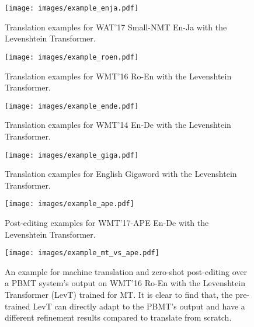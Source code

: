 \documentclass{article}
\begin{document}
\begin{figure}[htpb]
    \centering
    \texttt{[image: images/example\_enja.pdf]}
    \caption{Translation examples for WAT'17 Small-NMT En-Ja with the Levenshtein Transformer.}
    \label{fig:example-enja}
\end{figure}
\begin{figure}[htpb]
    \centering
    \texttt{[image: images/example\_roen.pdf]}
    \caption{Translation examples for WMT'16 Ro-En with the Levenshtein Transformer.}
    \label{fig:example-roen}
\end{figure}
\begin{figure}[htpb]
    \centering
    \texttt{[image: images/example\_ende.pdf]}
    \caption{Translation examples for WMT'14 En-De with the Levenshtein Transformer.}
    \label{fig:example-ende}
\end{figure}
\begin{figure}[htpb]
    \centering
    \texttt{[image: images/example\_giga.pdf]}
    \caption{Translation examples for English Gigaword with the Levenshtein Transformer.}
    \label{fig:example-giga}
\end{figure}
\begin{figure}[htpb]
    \centering
    \texttt{[image: images/example\_ape.pdf]}
    \caption{Post-editing examples for WMT'17-APE En-De with the Levenshtein Transformer.}
    \label{fig:example-ape}
\end{figure}
\begin{figure}[htpb]
    \centering
    \texttt{[image: images/example\_mt\_vs\_ape.pdf]}
    \caption{An example for machine translation and zero-shot post-editing over a PBMT system's output on WMT'16 Ro-En with the Levenshtein Transformer (LevT) trained for MT. It is clear to find that, the pre-trained LevT can directly adapt to the PBMT's output and have a different refinement results compared to translate from scratch.}
    \label{fig:example-mtape}
\end{figure}
\end{document}
